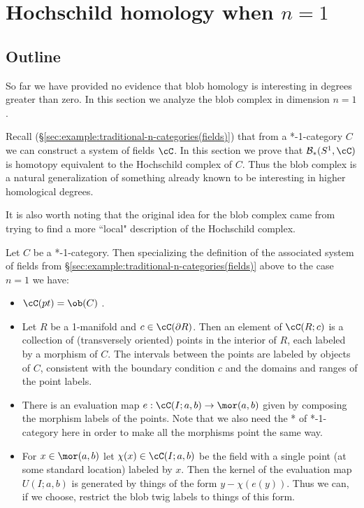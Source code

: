 
\section{Hochschild homology when \texorpdfstring{$n=1$}{n=1}}
\label{sec:hochschild}

\subsection{Outline}

So far we have provided no evidence that blob homology is interesting in degrees 
greater than zero.
In this section we analyze the blob complex in dimension $n=1$.

Recall (\S \ref{sec:example:traditional-n-categories(fields)}) 
that from a *-1-category $C$ we can construct a system of fields $\cC$.
In this section we prove that $\bc_*(S^1, \cC)$ is homotopy equivalent to the 
Hochschild complex of $C$.
Thus the blob complex is a natural generalization of something already
known to be interesting in higher homological degrees.

It is also worth noting that the original idea for the blob complex came from trying
to find a more ``local" description of the Hochschild complex.

\medskip

Let $C$ be a *-1-category.
Then specializing the definition of the associated system of fields from \S \ref{sec:example:traditional-n-categories(fields)} above to the case $n=1$ we have:
\begin{itemize}
\item $\cC(pt) = \ob(C)$ .
\item Let $R$ be a 1-manifold and $c \in \cC(\bd R)$.
Then an element of $\cC(R; c)$ is a collection of (transversely oriented)
points in the interior
of $R$, each labeled by a morphism of $C$.
The intervals between the points are labeled by objects of $C$, consistent with
the boundary condition $c$ and the domains and ranges of the point labels.
\item There is an evaluation map $e: \cC(I; a, b) \to \mor(a, b)$ given by
composing the morphism labels of the points.
Note that we also need the * of *-1-category here in order to make all the morphisms point
the same way.
\item For $x \in \mor(a, b)$ let $\chi(x) \in \cC(I; a, b)$ be the field with a single
point (at some standard location) labeled by $x$.
Then the kernel of the evaluation map $U(I; a, b)$ is generated by things of the
form $y - \chi(e(y))$.
Thus we can, if we choose, restrict the blob twig labels to things of this form.
\end{itemize}

